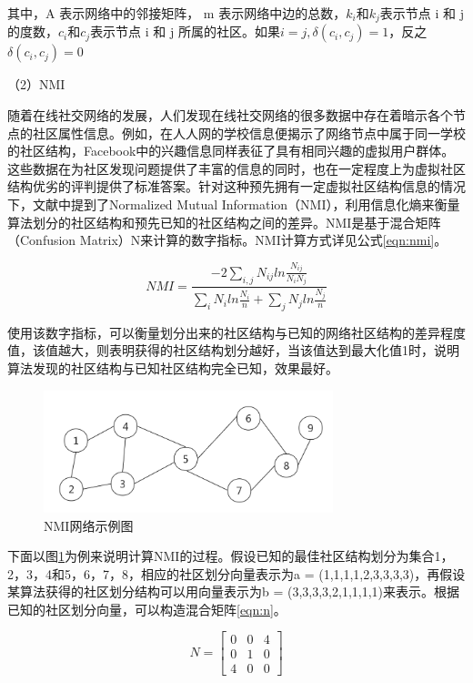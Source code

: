 其中，A 表示网络中的邻接矩阵， m 表示网络中边的总数，$k_i$和$k_j$表示节点 i 和 j 的度数，$c_i$和$c_j$表示节点 i 和 j 所属的社区。如果$i=j,\delta(c_i,c_j)=1$，反之$\delta(c_i,c_j)=0$

（2）NMI

随着在线社交网络的发展，人们发现在线社交网络的很多数据中存在着暗示各个节点的社区属性信息。例如，在人人网的学校信息便揭示了网络节点中属于同一学校的社区结构，Facebook中的兴趣信息同样表征了具有相同兴趣的虚拟用户群体。这些数据在为社区发现问题提供了丰富的信息的同时，也在一定程度上为虚拟社区结构优劣的评判提供了标准答案。针对这种预先拥有一定虚拟社区结构信息的情况下，文献\cite{Peng2014Weighting}中提到了Normalized Mutual Information（NMI），利用信息化熵来衡量算法划分的社区结构和预先已知的社区结构之间的差异。NMI是基于混合矩阵（Confusion Matrix）N来计算的数字指标。NMI计算方式详见公式\ref{eqn:nmi}。

\begin{equation}
  \label{eqn:nmi}
  NMI=\frac{ -2 \sum_{i,j} N_{ij}  ln{\frac{N_{ij}}{N_iN_j}} } {\sum_{i}N_iln{\frac{N_i}{n}}+\sum_{j}N_jln{\frac{N_j}{n}}}
\end{equation}

使用该数字指标，可以衡量划分出来的社区结构与已知的网络社区结构的差异程度值，该值越大，则表明获得的社区结构划分越好，当该值达到最大化值1时，说明算法发现的社区结构与已知社区结构完全已知，效果最好。

\begin{figure}
 \centering
 \includegraphics[width=0.75\textwidth]{figures/fig5-1}
 \caption{NMI网络示例图}\label{fig:fig5-1}
\end{figure}

下面以图\ref{fig:fig5-1}为例来说明计算NMI的过程。假设已知的最佳社区结构划分为集合{1，2，3，4}和{5，6，7，8}，相应的社区划分向量表示为a = (1,1,1,1,2,3,3,3,3)，再假设某算法获得的社区划分结构可以用向量表示为b = (3,3,3,3,2,1,1,1,1)来表示。根据已知的社区划分向量，可以构造混合矩阵\ref{eqn:n}。

\begin{equation}
  \label{eqn:n}
  N=\begin{bmatrix}
    0 & 0 &4 \\ 
    0 & 1 & 0\\ 
    4 & 0 & 0
    \end{bmatrix}
\end{equation}

